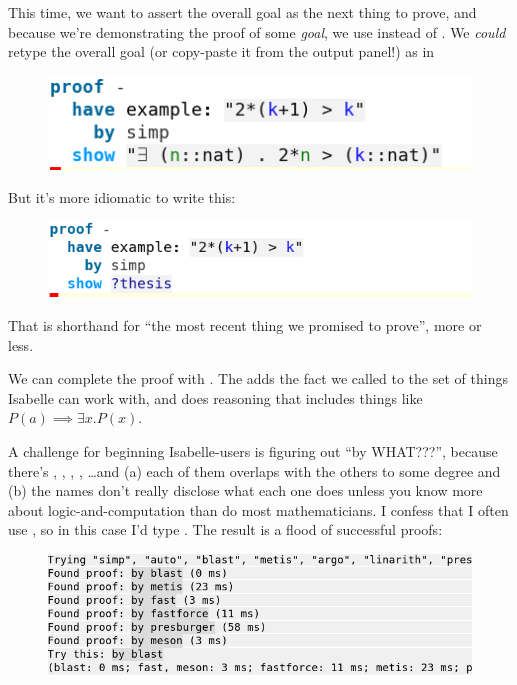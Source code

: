This time, we want to assert the overall goal as the next thing to prove, and because we're demonstrating the proof of some \textit{goal}, we use  instead of . We \textit{could} retype the overall goal (or copy-paste it from the output panel!) as in 
\begin{figure}[h]
    \includegraphics[width=0.5\linewidth]{TEXT/C01/Images/bad-show.png}
\end{figure}

But it's more idiomatic to write this:
\begin{figure}[H]
    \includegraphics[width=0.75\linewidth]{TEXT/C01/Images/good-show.png}
\end{figure}

That  is shorthand for ``the most recent thing we promised to prove'', more or less. 

We can complete the proof with . The  adds the fact we called  to the set of things Isabelle can work with, and  does reasoning that includes things like $P(a) \implies \exists x . P(x)$.

A challenge for beginning Isabelle-users is figuring out ``by WHAT???'', because there's , , , , \ldots  and (a) each of them overlaps with the others to some degree and (b) the names don't really disclose what each one does unless you know more about logic-and-computation than do most mathematicians. I confess that I often use , so in this case I'd type . The result is a flood of successful proofs:
\begin{figure}[h]
    \includegraphics[width=0.75\linewidth]{TEXT/C01/Images/flood.png}
\end{figure}

